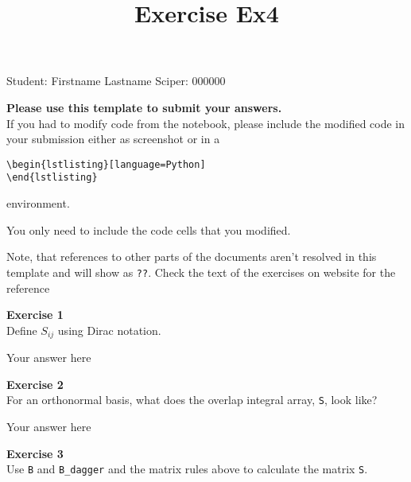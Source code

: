 \documentclass{article}
\title{Exercise Ex4}
\begin{document}
\maketitle\maketitle
\begin{center}\logo\end{center}


Student:  Firstname Lastname    Sciper: 000000

\begin{mdframed}
\textbf{Please use this template to submit your answers.}\\
If you had to modify code from the notebook, please include the modified code in your submission either as screenshot or in a

\begin{verbatim}
\begin{lstlisting}[language=Python]
\end{lstlisting}
\end{verbatim}

environment.

You only need to include the code cells that you modified.

Note, that references to other parts of the documents aren't resolved in this template and will show as \texttt{??}. Check the text of the exercises on website for the reference
\end{mdframed}

\begin{mdframed}
\textbf{Exercise 1}\\
Define $S_{ij}$ using Dirac notation.
\end{mdframed}

Your answer here

\begin{mdframed}
\textbf{Exercise 2}\\
For an orthonormal basis, what does the overlap integral array, \texttt{S}, look like?
\end{mdframed}

Your answer here

\begin{mdframed}
\textbf{Exercise 3}\\
Use \texttt{B} and \texttt{B\_dagger} and the matrix rules above to calculate the matrix \texttt{S}.
\end{mdframed}
\end{document}
